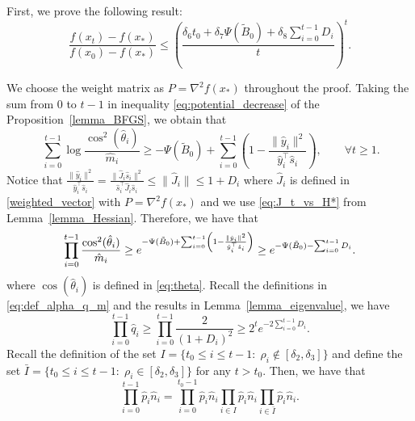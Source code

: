 \documentclass[11pt,letterpaper]{article}
\newcommand\0{{\Vector{0}}}
\newcommand\1{{\Vector{1}}}
\numberwithin{assumption}{section}
\numberwithin{definition}{section}
\numberwithin{theorem}{section}
\numberwithin{remark}{section}
\begin{document}
    First, we prove the following result:
    \begin{equation}
        \frac{f(x_t) - f(x_*)}{f(x_0) - f(x_*)} \leq \left(\frac{\delta_6 t_0 + \delta_7 \Psi(\tilde{B}_0) + \delta_8 \sum_{i = 0}^{t - 1}D_i}{t}\right)^{t}.
    \end{equation}
    
    We choose the weight matrix as $P = \nabla^2 f(x_*)$ throughout the proof. Taking the sum from $0$ to $t - 1$ in inequality \eqref{eq:potential_decrease} of the Proposition~\ref{lemma_BFGS}, we obtain that
    \begin{equation}\
        \sum_{i = 0}^{t - 1} \log{\frac{\cos^2(\hat{\theta}_i)}{\hat{m}_i}} \geq  - \Psi(\tilde{B}_{0}) + \sum_{i = 0}^{t - 1}\left(1 - \frac{\|\hat{y}_i\|^2}{\hat{y}_i^\top \hat{s}_i} \right), \qquad  \forall t \geq 1.
    \end{equation}
    Notice that $\frac{\|\hat{y}_i\|^2}{\hat{y}_i^\top \hat{s}_i} = \frac{\|\hat{J}_i \hat{s}_i\|^2}{\hat{s}_i^\top \hat{J}_i \hat{s}_i} \leq \|\hat{J}_i\| \leq 1 + D_i$ where $\hat{J}_i$ is defined in \eqref{weighted_vector} with $P = \nabla^2 f(x_*)$ and we use \eqref{eq:J_t_vs_H*} from Lemma~\ref{lemma_Hessian}. Therefore, we have that
    \begin{equation}\label{proposition_4_1}
        \prod_{i = 0}^{t - 1} \frac{\cos^2(\hat{\theta}_i)}{\hat{m}_i} \geq e^{- \Psi(\Tilde{B}_{0}) + \sum_{i = 0}^{t - 1}\left(1 - \frac{\|\hat{y}_i\|^2}{\hat{y}_i^\top \hat{s}_i} \right)} \geq e^{- \Psi(\Tilde{B}_{0}) - \sum_{i = 0}^{t - 1}D_i}.
    \end{equation}
    where $\cos(\hat{\theta}_i)$ is defined in \eqref{eq:theta}. Recall the definitions in \eqref{eq:def_alpha_q_m} and the results in Lemma~\ref{lemma_eigenvalue}, we have
    \begin{equation}\label{proposition_4_2}
        \prod_{i = 0}^{t - 1} \hat{q}_i \geq \prod_{i = 0}^{t - 1}\frac{2}{(1 + D_i)^2} \geq 2^t e^{-2\sum_{i = 0}^{t - 1}D_i}.
    \end{equation}
    Recall the definition of the set $I = \{t_0 \leq i \leq t - 1:\; \rho_i \notin [\delta_2,\delta_3]\}$ and define the set $\bar{I} = \{t_0 \leq i \leq t - 1:\; \rho_i \in [\delta_2, \delta_3]\}$ for any $t > t_0$. Then, we have that
    \begin{equation}\label{proposition_4_3}
        \prod_{i = 0}^{t - 1} \hat{p}_i\hat{n}_i = \prod_{i = 0}^{t_0 - 1} \hat{p}_i\hat{n}_i \prod_{i \in I} \hat{p}_i\hat{n}_i \prod_{i \in \bar{I}} \hat{p}_i\hat{n}_i.
    \end{equation}
\end{document}
